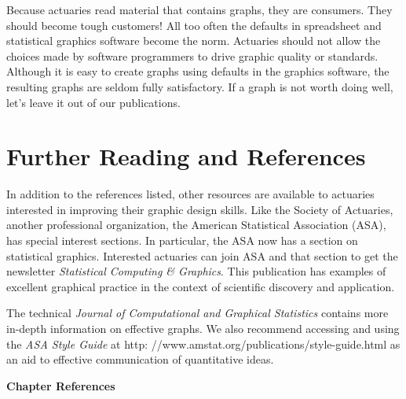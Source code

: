 Because actuaries read material that contains graphs, they are
consumers. They should become tough customers! All too often the
defaults in spreadsheet and statistical graphics software become the
norm. Actuaries should not allow the choices made by software
programmers to drive graphic quality or standards. Although it is
easy to create graphs using defaults in the graphics software, the
resulting graphs are seldom fully satisfactory. If a graph is not
worth doing well, let's leave it out of our publications.


\section{Further Reading and References}\label{S21:References}

In addition to the references listed, other resources are available
to actuaries interested in improving their graphic design skills.
Like the Society of Actuaries, another professional organization,
the American Statistical Association (ASA), has special interest
sections. In particular, the ASA now has a section on statistical
graphics. Interested actuaries can join ASA and that section to get
the newsletter \emph{Statistical Computing \& Graphics}. This
publication has examples of excellent graphical practice in the
context of scientific discovery and application.

The technical \emph{Journal of Computational and Graphical
Statistics} contains more in-depth information on effective graphs.
We also recommend accessing and using the \emph{ASA Style Guide }at
http:
//www.amstat.org/publications/style-guide.html as an aid to
effective communication of quantitative ideas.

\bigskip

\textbf{Chapter References}

